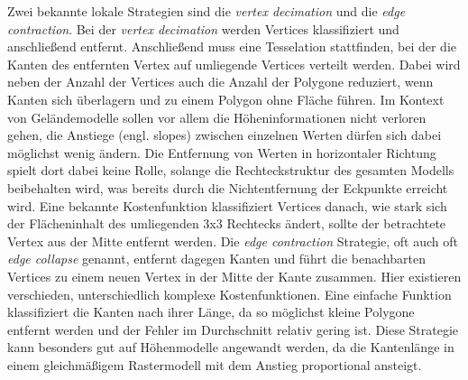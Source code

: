 Zwei bekannte lokale Strategien sind die \textit{vertex decimation} und die \textit{edge contraction}. Bei der \textit{vertex decimation} werden Vertices klassifiziert und anschließend entfernt. Anschließend muss eine Tesselation stattfinden, bei der die Kanten des entfernten Vertex auf umliegende Vertices verteilt werden. Dabei wird neben der Anzahl der Vertices auch die Anzahl der Polygone reduziert, wenn Kanten sich überlagern und zu einem Polygon ohne Fläche führen\cite[Abschnitt 3.1]{meshSimplSurvey}. Im Kontext von Geländemodelle sollen vor allem die Höheninformationen nicht verloren gehen, die Anstiege (engl. slopes) zwischen einzelnen Werten dürfen sich dabei möglichst wenig ändern. Die Entfernung von Werten in horizontaler Richtung spielt dort dabei keine Rolle, solange die Rechteckstruktur des gesamten Modells beibehalten wird, was bereits durch die Nichtentfernung der Eckpunkte erreicht wird. Eine bekannte Kostenfunktion klassifiziert Vertices danach, wie stark sich der Flächeninhalt des umliegenden 3x3 Rechtecks ändert, sollte der betrachtete Vertex aus der Mitte entfernt werden\cite{topoDataReduction}. Die \textit{edge contraction} Strategie, oft auch oft \textit{edge collapse} genannt, entfernt dagegen Kanten und führt die benachbarten Vertices zu einem neuen Vertex in der Mitte der Kante zusammen. Hier existieren verschieden, unterschiedlich komplexe Kostenfunktionen\cite[Abschnitt 3.2]{meshSimplSurvey}. Eine einfache Funktion klassifiziert die Kanten nach ihrer Länge, da so möglichst kleine Polygone entfernt werden und der Fehler im Durchschnitt relativ gering ist. Diese Strategie kann besonders gut auf Höhenmodelle angewandt werden, da die Kantenlänge in einem gleichmäßigem Rastermodell mit dem Anstieg proportional ansteigt.

